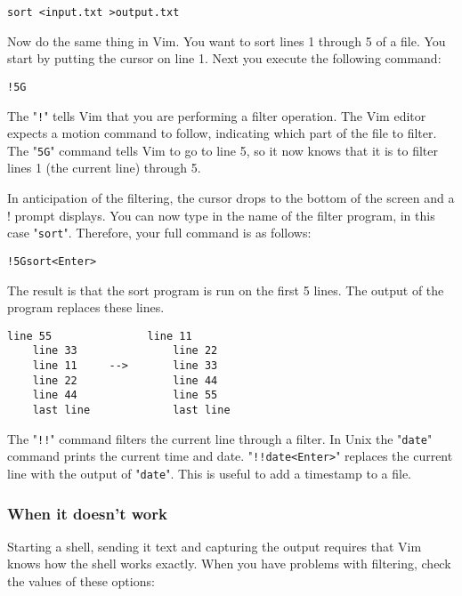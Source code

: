 {\begin{Verbatim}[samepage=true]
 sort <input.txt >output.txt
\end{Verbatim}

Now do the same thing in Vim.
You want to sort lines 1 through 5 of a file.
You start by putting the cursor on line 1.
Next you execute the following command:

\begin{Verbatim}[samepage=true]
 !5G
\end{Verbatim}

The "\texttt{!}" tells Vim that you are performing a filter operation.
The Vim editor expects a motion command to follow, indicating which part of the file to filter.
The "\texttt{5G}" command tells Vim to go to line 5, so it now knows that it is to filter lines 1 (the current line) through 5.

In anticipation of the filtering, the cursor drops to the bottom of the screen and a ! prompt displays.
You can now type in the name of the filter program, in this case "\texttt{sort}".
Therefore, your full command is as follows:

\begin{Verbatim}[samepage=true]
 !5Gsort<Enter>
\end{Verbatim}

The result is that the sort program is run on the first 5 lines.
The output of the program replaces these lines.

\begin{Verbatim}[samepage=true]
    line 55               line 11
    line 33               line 22
    line 11     -->       line 33
    line 22               line 44
    line 44               line 55
    last line             last line
\end{Verbatim}

The "\texttt{!!}" command filters the current line through a filter.
In Unix the "\texttt{date}" command prints the current time and date.
"\texttt{!!date<Enter>}" replaces the current line with the output of "\texttt{date}".
This is useful to add a timestamp to a file.

\subsubsection{When it doesn't work}
Starting a shell, sending it text and capturing the output requires that Vim knows how the shell works exactly.
When you have problems with filtering, check the values of these options:

}
